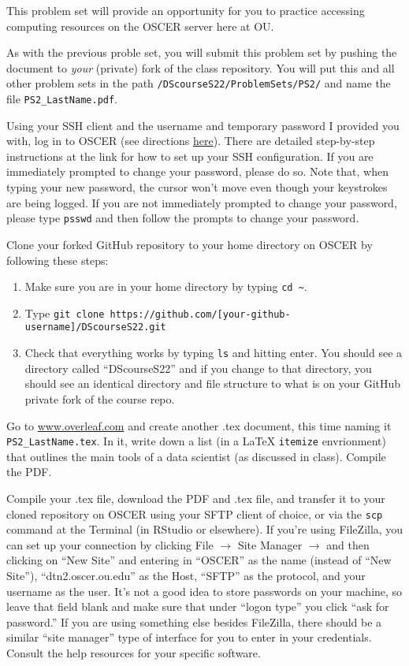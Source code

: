 \documentclass[12pt,english]{exam}
\begin{document}
This problem set will provide an opportunity for you to practice accessing computing resources on the OSCER server here at OU.

As with the previous proble set, you will submit this problem set by pushing the document to \emph{your} (private) fork of the class repository. You will put this and all other problem sets in the path \texttt{/DScourseS22/ProblemSets/PS2/} and name the file \texttt{PS2\_LastName.pdf}.
\begin{questions}
\question Using your SSH client and the username and temporary password I provided you with, log in to OSCER (see directions \href{www.ou.edu/content/oscer/getting_started/getting_started_using_oscer.html}{here}). There are detailed step-by-step instructions at the link for how to set up your SSH configuration. If you are immediately prompted to change your password, please do so. Note that, when typing your new password, the cursor won't move even though your keystrokes are being logged. If you are not immediately prompted to change your password, please type \texttt{psswd} and then follow the prompts to change your password.

\question Clone your forked GitHub repository to your home directory on OSCER by following these steps:
\begin{enumerate}
	\item Make sure you are in your home directory by typing \texttt{cd \~}.
	\item Type \texttt{git clone https://github.com/[your-github-username]/DScourseS22.git}
	\item Check that everything works by typing \texttt{ls} and hitting enter. You should see a directory called ``DScourseS22'' and if you change to that directory, you should see an identical directory and file structure to what is on your GitHub private fork of the course repo.
\end{enumerate}

\question Go to \url{www.overleaf.com} and create another .tex document, this time naming it \texttt{PS2\_LastName.tex}. In it, write down a list (in a LaTeX \texttt{itemize} envrionment) that outlines the main tools of a data scientist (as discussed in class). Compile the PDF.

\question Compile your .tex file, download the PDF and .tex file, and transfer it to your cloned repository on OSCER using your SFTP client of choice, or via the \texttt{scp} command at the Terminal (in RStudio or elsewhere). If you're using FileZilla, you can set up your connection by clicking File $\rightarrow$ Site Manager $\rightarrow$ and then clicking on ``New Site'' and entering in ``OSCER'' as the name (instead of ``New Site''), ``dtn2.oscer.ou.edu'' as the Host, ``SFTP'' as the protocol, and your username as the user. It's not a good idea to store passwords on your machine, so leave that field blank and make sure that under ``logon type'' you click ``ask for password.'' If you are using something else besides FileZilla, there should be a similar ``site manager'' type of interface for you to enter in your credentials. Consult the help resources for your specific software.


\end{questions}
\end{document}

